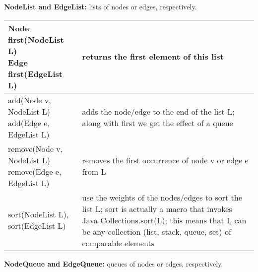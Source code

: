 \begin{table}
  \small
  \centering

  \textbf{NodeList and EdgeList:} lists of nodes or edges, respectively.
  
  \medskip
  \begin{tabular}{| m{} | m{} |}
    \hline
    \shortstack[l]{
      \textsf{Node first(NodeList L)}\\
      \textsf{Edge first(EdgeList L)}
    }
    &
    returns the first element of this list
    \\ \hline
    \shortstack[l]{
      \textsf{add(Node v, NodeList L)}\\
      \textsf{add(Edge e, EdgeList L)}
    }
    &
    adds the node/edge to the end of the list \textsf{L}; along with \textsf{first}
    we get the effect of a queue
    \\ \hline
    \shortstack[l]{
      \textsf{remove(Node v, NodeList L)}\\
      \textsf{remove(Edge e, EdgeList L)}
    }
    &
    removes the first occurrence of node \textsf{v} or edge \textsf{e} from \textsf{L}
    \\ \hline
    \textsf{sort(NodeList L)}, \textsf{sort(EdgeList L)}
    &
    use the weights of the nodes/edges to sort the list \textsf{L};
    sort is actually a macro that invokes Java \textsf{Collections.sort(L)};
    this means that \textsf{L} can be any collection (list, stack, queue, set)
    of comparable elements
    \\ \hline
  \end{tabular}  
  
\bigskip
  \textbf{NodeQueue and EdgeQueue:} queues of nodes or edges, respectively.


\end{table}
